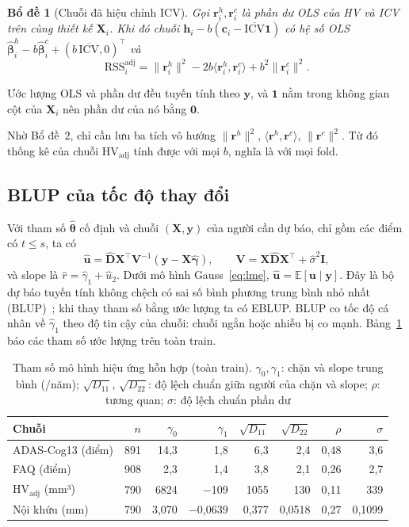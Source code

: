 \documentclass[journal]{IEEEtran}
\newtheorem{lemma}{Bổ đề}
\newcommand{\HVadj}{\mathrm{HV}_{\text{adj}}}
\begin{document}
\begin{lemma}[Chuỗi đã hiệu chỉnh ICV]
Gọi $\bm r_i^h,\bm r_i^c$ là phần dư OLS của HV và ICV trên cùng thiết kế $\bm X_i$. Khi đó chuỗi $\bm h_i-b(\bm c_i-\overline{\mathrm{ICV}}\bm 1)$ có hệ số OLS $\hat{\bm\beta}_i^h-b\hat{\bm\beta}_i^c+(b\,\overline{\mathrm{ICV}},0)^\top$ và
\[
\mathrm{RSS}_i^{\text{adj}}=\|\bm r_i^h\|^2-2b\langle\bm r_i^h,\bm r_i^c\rangle+b^2\|\bm r_i^c\|^2.
\]
\end{lemma}
\begin{IEEEproof}
Ước lượng OLS và phần dư đều tuyến tính theo $\bm y$, và $\bm 1$ nằm trong không gian cột của $\bm X_i$ nên phần dư của nó bằng $\bm 0$.
\end{IEEEproof}
Nhờ Bổ đề~2, chỉ cần lưu ba tích vô hướng $\|\bm r^h\|^2$, $\langle\bm r^h,\bm r^c\rangle$, $\|\bm r^c\|^2$. Từ đó thống kê của chuỗi $\HVadj$ tính được với mọi $b$, nghĩa là với mọi fold.

\subsection{BLUP của tốc độ thay đổi}
Với tham số $\hat{\bm\theta}$ cố định và chuỗi $(\bm X,\bm y)$ của người cần dự báo, chỉ gồm các điểm có $t\le s$, ta có
\begin{equation}\label{eq:blup}
\hat{\bm u}=\hat{\bm D}\bm X^\top\bm V^{-1}(\bm y-\bm X\hat{\bm\gamma}),\qquad \bm V=\bm X\hat{\bm D}\bm X^\top+\hat\sigma^2\bm I,
\end{equation}
và slope là $\hat r=\hat\gamma_1+\hat u_2$. Dưới mô hình Gauss~\eqref{eq:lme}, $\hat{\bm u}=\mathbb E[\bm u\mid\bm y]$. Đây là bộ dự báo tuyến tính không chệch có sai số bình phương trung bình nhỏ nhất (BLUP)~\cite{henderson1975,robinson1991}; khi thay tham số bằng ước lượng ta có EBLUP. BLUP co tốc độ cá nhân về $\hat\gamma_1$ theo độ tin cậy của chuỗi: chuỗi ngắn hoặc nhiễu bị co mạnh. Bảng~\ref{tab:lme} báo các tham số ước lượng trên toàn train.

\begin{table}[t]
\caption{Tham số mô hình hiệu ứng hỗn hợp (toàn train). $\gamma_0,\gamma_1$: chặn và slope trung bình (/năm); $\sqrt{D_{11}}$, $\sqrt{D_{22}}$: độ lệch chuẩn giữa người của chặn và slope; $\rho$: tương quan; $\sigma$: độ lệch chuẩn phần dư}\label{tab:lme}
\centering\footnotesize\setlength{\tabcolsep}{2.6pt}
\begin{tabular}{@{}lrrrrrrr@{}}
\toprule
Chuỗi & $n$ & $\gamma_0$ & $\gamma_1$ & $\sqrt{D_{11}}$ & $\sqrt{D_{22}}$ & $\rho$ & $\sigma$\\
\midrule
ADAS-Cog13 (điểm) & 891 & 14,3 & 1,8 & 6,3 & 2,4 & 0,48 & 3,6\\
FAQ (điểm) & 908 & 2,3 & 1,4 & 3,8 & 2,1 & 0,26 & 2,7\\
$\HVadj$ (mm³) & 790 & 6824 & $-$109 & 1055 & 130 & 0,11 & 339\\
Nội khứu (mm) & 790 & 3,070 & $-$0,0639 & 0,377 & 0,0518 & 0,27 & 0,1099\\
\bottomrule
\end{tabular}
\end{table}
\end{document}
